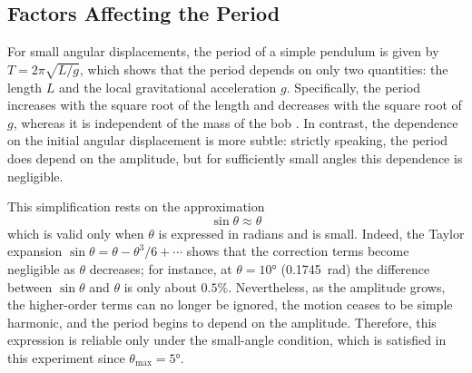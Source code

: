 \documentclass[11pt,a4paper]{article}
\begin{document}
\subsection{Factors Affecting the Period}
For small angular displacements, the period of a simple pendulum is given
by $T = 2\pi\sqrt{L/g}$, which shows that the period depends on only two
quantities: the length $L$ and the local gravitational acceleration $g$.
Specifically, the period increases with the square root
of the length and decreases with the square root of $g$, whereas it is
independent of the mass of the bob \citep{serway2013physics}. In contrast,
the dependence on the initial angular displacement is more subtle:
strictly speaking, the period does depend on the amplitude, but for
sufficiently small angles this dependence is negligible.

This simplification rests on the approximation
\begin{equation}
  \sin\theta \approx \theta
  \label{eq:smallangle}
\end{equation}
which is valid only when $\theta$ is expressed in radians and is small.
Indeed, the Taylor expansion $\sin\theta = \theta - \theta^{3}/6 + \cdots$
shows that the correction terms become negligible as $\theta$ decreases;
for instance, at $\theta = \ang{10}$ (\qty{0.1745}{\radian}) the
difference between $\sin\theta$ and $\theta$ is only about $0.5\%$.
Nevertheless, as the amplitude grows, the higher-order terms can no longer
be ignored, the motion ceases to be simple harmonic, and the period begins
to depend on the amplitude. Therefore, this expression is reliable only
under the small-angle condition, which is satisfied in this experiment
since $\theta_{\max} = \ang{5}$.
\end{document}
